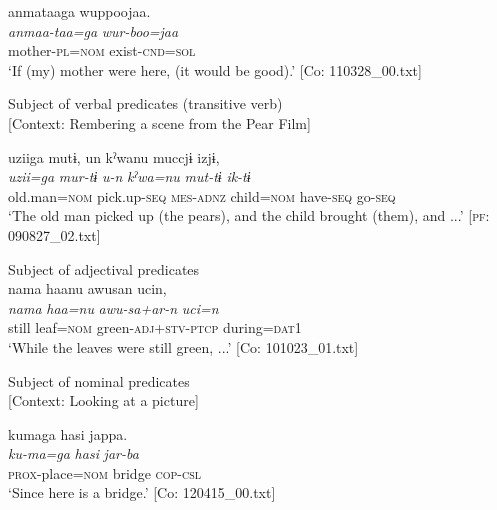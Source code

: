 {\TM}
\glll anmataaga  wuppoojaa.\\
      \textit{anmaa-taa=ga}  \textit{wur-boo=jaa}\\
      mother-\textsc{pl}=\textsc{nom}  exist-\textsc{cnd}=\textsc{sol}\\
\glt ‘If (my) mother were here, (it would be good).’ [Co: 110328\_00.txt]

\ex Subject of verbal predicates (transitive verb)\\{}
[Context: Rembering a scene from the Pear Film]

{\TM}
\glll uziiga  mutɨ,  un  kˀwanu  muccjɨ  izjɨ,\\
      \textit{uzii=ga}  \textit{mur-tɨ}  \textit{u-n}  \textit{kˀwa=nu}     \textit{mut-tɨ}  \textit{ik-tɨ}\\
      old.man=\textsc{nom}  pick.up-\textsc{seq}  \textsc{mes}-\textsc{adnz}  child=\textsc{nom} have-\textsc{seq}  go-\textsc{seq}\\
\glt ‘The old man picked up (the pears), and the child brought (them), and ...’ [\textsc{pf}: 090827\_02.txt]

\ex Subject of adjectival predicates\\
{\TM}
\glll  nama  haanu  awusan  ucin,\\
\textit{nama}  \textit{haa=nu}  \textit{awu-sa+ar-n}  \textit{uci=n}\\
still  leaf=\textsc{nom}  green-\textsc{adj}+\textsc{stv}-\textsc{ptcp}  during=\textsc{dat}1\\
\glt ‘While the leaves were still green, ...’ [Co: 101023\_01.txt]

\ex Subject of nominal predicates\\{}
[Context: Looking at a picture]

{\TM}
\glll kumaga  hasi  jappa.\\
      \textit{ku-ma=ga}  \textit{hasi}  \textit{jar-ba}\\
      \textsc{prox}-place=\textsc{nom}  bridge  \textsc{cop}-\textsc{csl}\\
\glt ‘Since here is a bridge.’ [Co: 120415\_00.txt]
\z
\z


